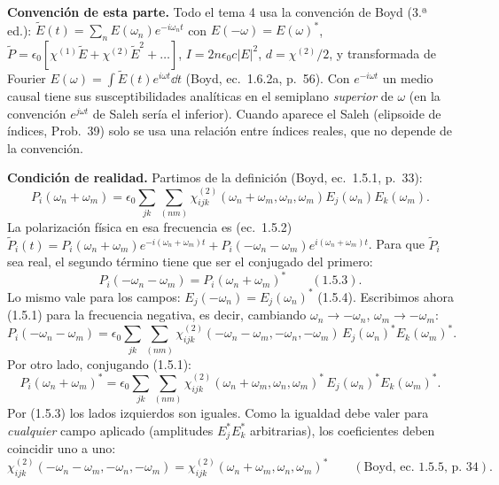 
\noindent\textbf{Convención de esta parte.} Todo el tema 4 usa la convención de Boyd (3.ª ed.):
$\tilde E(t)=\sum_n E(\omega_n)e^{-i\omega_nt}$ con $E(-\omega)=E(\omega)^*$, $\tilde P=\epsilon_0[\chi^{(1)}\tilde E+\chi^{(2)}\tilde E^2+\dots]$,
$I=2n\epsilon_0c|E|^2$, $d=\chi^{(2)}/2$, y transformada de Fourier $E(\omega)=\int\tilde E(t)e^{i\omega t}\dd t$ (Boyd, ec.~1.6.2a, p.~56).
Con $e^{-i\omega t}$ un medio causal tiene sus susceptibilidades analíticas en el semiplano \emph{superior} de $\omega$ (en la
convención $e^{j\omega t}$ de Saleh sería el inferior). Cuando aparece el Saleh (elipsoide de índices, Prob.~39) solo se usa
una relación entre índices reales, que no depende de la convención.

\label{sol:34}

 \textbf{Condición de realidad.} Partimos de la definición (Boyd, ec.~1.5.1, p.~33):
\[
P_i(\omega_n+\omega_m)=\epsilon_0\sum_{jk}\sum_{(nm)}\chi^{(2)}_{ijk}(\omega_n+\omega_m,\omega_n,\omega_m)E_j(\omega_n)E_k(\omega_m).
\]
La polarización física en esa frecuencia es (ec.~1.5.2)
$\tilde P_i(t)=P_i(\omega_n+\omega_m)e^{-i(\omega_n+\omega_m)t}+P_i(-\omega_n-\omega_m)e^{i(\omega_n+\omega_m)t}$.
Para que $\tilde P_i$ sea real, el segundo término tiene que ser el conjugado del primero:
\[
P_i(-\omega_n-\omega_m)=P_i(\omega_n+\omega_m)^*\qquad(1.5.3).
\]
Lo mismo vale para los campos: $E_j(-\omega_n)=E_j(\omega_n)^*$ (1.5.4). Escribimos ahora (1.5.1) para la frecuencia negativa,
es decir, cambiando $\omega_n\to-\omega_n$, $\omega_m\to-\omega_m$:
\[
P_i(-\omega_n-\omega_m)=\epsilon_0\sum_{jk}\sum_{(nm)}\chi^{(2)}_{ijk}(-\omega_n-\omega_m,-\omega_n,-\omega_m)\,E_j(\omega_n)^*E_k(\omega_m)^*.
\]
Por otro lado, conjugando (1.5.1):
\[
P_i(\omega_n+\omega_m)^*=\epsilon_0\sum_{jk}\sum_{(nm)}\chi^{(2)}_{ijk}(\omega_n+\omega_m,\omega_n,\omega_m)^*\,E_j(\omega_n)^*E_k(\omega_m)^*.
\]
Por (1.5.3) los lados izquierdos son iguales. Como la igualdad debe valer para \emph{cualquier} campo aplicado (amplitudes
$E_j^*E_k^*$ arbitrarias), los coeficientes deben coincidir uno a uno:
\[
\chi^{(2)}_{ijk}(-\omega_n-\omega_m,-\omega_n,-\omega_m)=\chi^{(2)}_{ijk}(\omega_n+\omega_m,\omega_n,\omega_m)^*\qquad(\text{Boyd, ec.~1.5.5, p.~34}).
\]

